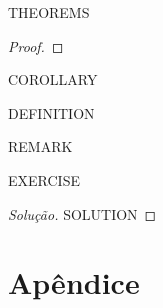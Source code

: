 \documentclass[a4paper,12pt,twoside,portuguese]{all-in-one} %
\begin{document}
\begin{theorem}
THEOREMS
\end{theorem}
\begin{proof}
\end{proof}
\begin{corollary}
COROLLARY
\end{corollary}
\begin{definition}
DEFINITION
\end{definition}
\begin{remark}
REMARK
\end{remark}
\begin{exercise}
EXERCISE
\end{exercise}
\begin{proof}[Solução]
SOLUTION
\end{proof}
\clearpage

\appendix
\section{Apêndice}


\clearpage
\pagestyle{\auxsettings}
\printbibliography[heading=bibintoc]
\end{document}

